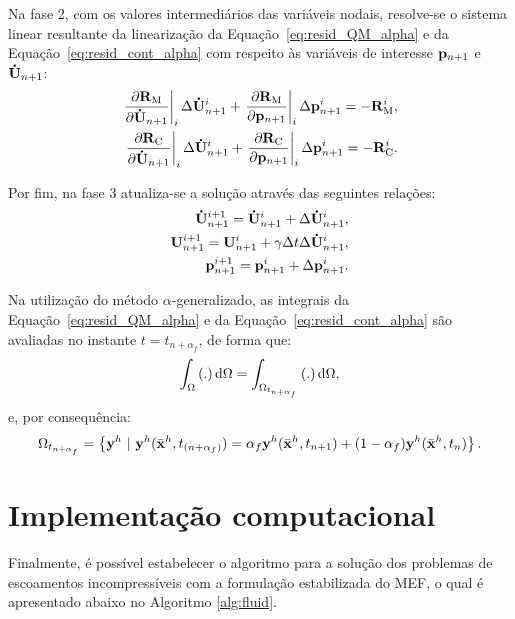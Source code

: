 Na fase 2, com os valores intermediários das variáveis nodais, resolve-se o sistema linear resultante da linearização da Equação~\eqref{eq:resid_QM_alpha} e da Equação~\eqref{eq:resid_cont_alpha} com respeito às variáveis de interesse $\mathbf{p}_{n+1}$ e $\mathbf{\dot{U}}_{n+1}$:
\begin{align}
\left .\frac{\partial\mathbf{R}_\mathrm{M}}{\partial\mathbf{\dot{U}}_{n+1}}\right|_{i} \Delta \mathbf{\dot{U}}_{n+1}^{i} + \left .\frac{\partial\mathbf{R}_\mathrm{M}}{\partial\mathbf{p}_{n+1}}\right|_{i} \Delta \mathbf{p}_{n+1}^{i} = -\mathbf{R}_\mathrm{M}^{i}, \label{eq:eq_lin_QM} \\
\left .\frac{\partial\mathbf{R}_\mathrm{C}}{\partial\mathbf{\dot{U}}_{n+1}}\right|_{i} \Delta \mathbf{\dot{U}}_{n+1}^{i} + \left .\frac{\partial\mathbf{R}_\mathrm{C}}{\partial\mathbf{p}_{n+1}}\right|_{i} \Delta \mathbf{p}_{n+1}^{i} = -\mathbf{R}_\mathrm{C}^{i}.\label{eq:eq_lin_cont}
\end{align}

Por fim, na fase 3 atualiza-se a solução através das seguintes relações:
\begin{align}
\mathbf{\dot{U}}_{n+1}^{i+1} = \mathbf{\dot{U}}_{n+1}^{i} + \Delta\mathbf{\dot{U}}_{n+1}^{i},\label{eq:atu_acel} \\ 
\mathbf{U}_{n+1}^{i+1} = \mathbf{U}_{n+1}^{i} + \gamma \Delta t \Delta\mathbf{\dot{U}}_{n+1}^{i},\label{eq:atu_vel}\\
\mathbf{p}_{n+1}^{i+1} = \mathbf{p}_{n+1}^{i} + \Delta\mathbf{p}_{n+1}^{i}.\label{eq:atu_press}
\end{align}

Na utilização do método $\alpha$-generalizado, as integrais da Equação~\eqref{eq:resid_QM_alpha} e da Equação~\eqref{eq:resid_cont_alpha} são avaliadas no instante $t = t_{n+\alpha_{f}}$, de forma que:
\begin{align}
\int_{\Omega} \left(.\right) \mathrm{d} \Omega = \int_{\Omega_{t_{n+\alpha_{f}}}} \left(.\right) \mathrm{d} \Omega,
\end{align}
\noindent e, por consequência:
\begin{align}
\Omega_{t_{n+\alpha_{f}}} = \left\{\mathbf{y}^h \  |\  \mathbf{y}^h(\bar{\mathbf{x}}^h,t_{(n+\alpha_f)}) = \alpha_f \mathbf{y}^h(\bar{\mathbf{x}}^h,t_{n+1}) + (1-\alpha_f) \mathbf{y}^h(\bar{\mathbf{x}}^h,t_n)  \right\}.
\end{align}

\section{Implementação computacional} \label{capitulo:Cap2:ImpleComput}

Finalmente, é possível estabelecer o algoritmo para a solução dos problemas de escoamentos incompressíveis com a formulação estabilizada do MEF, o qual é apresentado abaixo no Algoritmo \ref{alg:fluid}.

